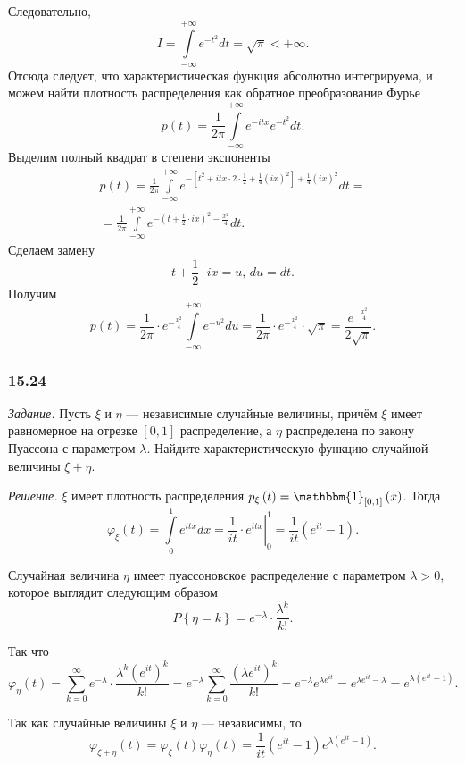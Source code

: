 \begin{enumerate}[label=\alph*)]
Следовательно,
$$I =
\int \limits_{- \infty }^{+ \infty } e^{- t^2} dt =
\sqrt{ \pi } <
+ \infty.$$
Отсюда следует, что характеристическая функция абсолютно интегрируема, и можем найти плотность распределения как обратное преобразование Фурье
$$p \left( t \right) =
\frac{1}{2 \pi } \int \limits_{- \infty }^{+ \infty } e^{- itx} e^{- t^2} dt.$$
Выделим полный квадрат в степени экспоненты
\begin{equation*}
\begin{split}
p \left( t \right) =
\frac{1}{2 \pi }
\int \limits_{- \infty }^{+ \infty } e^{- \left[ t^2 + itx \cdot 2 \cdot \frac{1}{2} + \frac{1}{4} \left( ix \right)^2 \right] + \frac{1}{4} \left( ix \right)^2} dt = \\
= \frac{1}{2 \pi } \int \limits_{- \infty }^{+ \infty } e^{- \left( t + \frac{1}{2} \cdot ix \right)^2 - \frac{x^2}{4}} dt.
\end{split}
\end{equation*}
Сделаем замену
$$t + \frac{1}{2} \cdot ix = u, \, du = dt.$$
Получим
$$p \left( t \right) =
\frac{1}{2 \pi } \cdot e^{- \frac{x^2}{4}} \int \limits_{- \infty }^{+ \infty } e^{- u^2} du =
\frac{1}{2 \pi } \cdot e^{- \frac{x^2}{4}} \cdot \sqrt{ \pi } =
\frac{e^{- \frac{x^2}{4}}}{2 \sqrt{ \pi }}.$$
\end{enumerate}

\subsubsection*{15.24}

\textit{Задание.}
Пусть $ \xi $ и $ \eta $ --- независимые случайные величины, причём $ \xi $ имеет равномерное на отрезке $ \left[ 0, 1 \right] $ распределение,
а $ \eta $ распределена по закону Пуассона с параметром $ \lambda $.
Найдите характеристическую функцию случайной величины $ \xi + \eta $.

\textit{Решение.} $ \xi $ имеет плотность распределения $p_{ \xi } \left( t \right) = \mathbbm{1}_{ \left[ 0, 1 \right] } \left( x \right) $.
Тогда
$$ \varphi_{ \xi } \left( t \right) =
\int \limits_0^1 e^{itx} dx =
\left. \frac{1}{it} \cdot e^{itx} \right|_0^1 =
\frac{1}{it} \left( e^{it} - 1 \right).$$

Случайная величина $ \eta $ имеет пуассоновское распределение с параметром $ \lambda > 0$, которое выглядит следующим образом
$$P \left\{ \eta = k \right\} =
e^{- \lambda } \cdot \frac{ \lambda^k}{k!}.$$

Так что
$$ \varphi_{ \eta } \left( t \right) =
\sum \limits_{k = 0}^{ \infty } e^{- \lambda } \cdot \frac{ \lambda^k \left( e^{it} \right)^k}{k!} =
e^{- \lambda } \sum \limits_{k = 0}^{ \infty } \frac{ \left( \lambda e^{it} \right)^k}{k!} =
e^{- \lambda } e^{ \lambda e^{it}} =
e^{ \lambda e^{it} - \lambda } =
e^{ \lambda \left( e^{it} - 1 \right) }.$$

Так как случайные величины $ \xi $ и $ \eta $ --- независимы, то
$$ \varphi_{ \xi + \eta } \left( t \right) =
\varphi_{ \xi } \left( t \right) \varphi_{ \eta } \left( t \right) =
\frac{1}{it} \left( e^{it} - 1 \right) e^{ \lambda \left( e^{it} - 1 \right) }.$$
